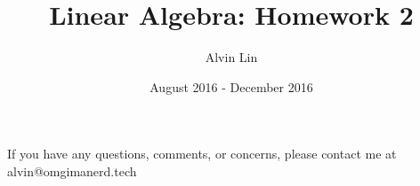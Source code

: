 \documentclass[letterpaper, 12pt]{math}
\title{Linear Algebra: Homework 2}
\author{Alvin Lin}
\date{August 2016 - December 2016}
\begin{document}
\maketitle

\begin{center}
  If you have any questions, comments, or concerns, please contact me at
  alvin@omgimanerd.tech
\end{center}
\end{document}
